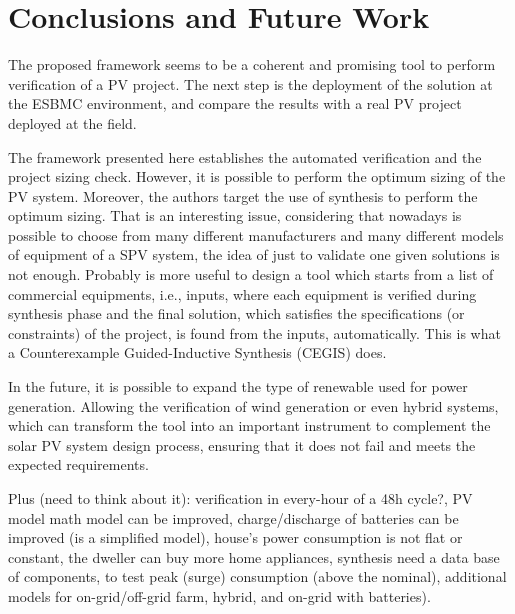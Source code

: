\documentclass[journal]{IEEEtran}
\begin{document}
\section{Conclusions and Future Work}
The proposed framework seems to be a coherent and promising tool to perform verification of a PV project. The next step is the deployment of the solution at the ESBMC environment, and compare the results with a real PV project deployed at the field. 

The framework presented here establishes the automated verification and the project sizing check. However, it is possible to perform the optimum sizing of the PV system. Moreover, the authors target the use of synthesis to perform the optimum sizing. That is an interesting issue, considering that nowadays is possible to choose from many different manufacturers and many different models of equipment of a SPV system,  the idea of just to validate one given solutions is not enough. Probably is more useful to design a tool which starts from a list of commercial equipments, i.e., inputs, where each equipment is verified during synthesis phase and the final solution, which satisfies the specifications (or constraints) of the project, is found from the inputs, automatically. This is what a Counterexample Guided-Inductive Synthesis (CEGIS) does. 

In the future, it is possible to expand the type of renewable used for power generation. Allowing the verification of wind generation or even hybrid systems, which can transform the tool into an important instrument to complement the solar PV system design process, ensuring that it does not fail and meets the expected requirements. 

Plus (need to think about it): verification in every-hour of a 48h cycle?, PV model math model can be improved, charge/discharge of batteries can be improved (is a simplified model), house's power consumption is not flat or constant, the dweller can buy more home appliances, synthesis need a data base of components, to test peak (surge) consumption (above the nominal), additional models for on-grid/off-grid farm, hybrid, and on-grid with batteries).

\end{document}
